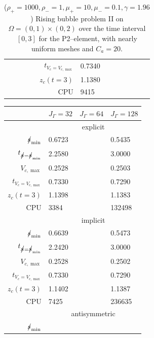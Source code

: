 \begin{table}
\begin{tabular}{rlll}
$t_{V_c = V_{c,\max}}$           & 0.7340 & & \\
$z_c(t=3)$                       & 1.1380 & & \\
CPU                              &   9415 & & \\
\hline
\end{tabular}
\hspace*{-3.25cm}
\caption[Navier--Stokes 2d rising bubble II benchmark values P2--\pdg]
{($\rho_+ = 1000,\rho_- = 1,\mu_+ = 10,\mu_- =0.1,\gamma = 1.96$)
Rising bubble problem II on ${\Omega = (0,1) \times (0,2)}$ over the time
interval $[0,3]$ for the P2--\pdg element, with nearly uniform meshes and
$C_a=20$\textdegree.}
\label{tab:risingbubble2DIIp2p1dg}
\end{table}

\begin{table}
\center
\hspace*{-3.25cm}
\begin{tabular}{rlll}
\hline
 & $J_\Gamma=32$ & $J_\Gamma=64$ & $J_\Gamma=128$ \\
\hline
& \multicolumn{3}{c}{explicit} \\
\cmidrule{2-4}
$\mbox{$s\!\!\!\!\:/$}_{\min}$                & 0.6723 & & 0.5435 \\
$t_{\strikes = \strikes_{\min}}$ & 2.2580 & & 3.0000 \\
$V_{c,\max}$                     & 0.2528 & & 0.2503 \\
$t_{V_c = V_{c,\max}}$           & 0.7330 & & 0.7290 \\
$z_c(t=3)$                       & 1.1398 & & 1.1383 \\
CPU                              &   3384 & & 132498 \\
\cmidrule{2-4}
& \multicolumn{3}{c}{implicit} \\
\cmidrule{2-4}
$\mbox{$s\!\!\!\!\:/$}_{\min}$                & 0.6639 & & 0.5473 \\
$t_{\strikes = \strikes_{\min}}$ & 2.2420 & & 3.0000 \\
$V_{c,\max}$                     & 0.2528 & & 0.2502 \\
$t_{V_c = V_{c,\max}}$           & 0.7330 & & 0.7290 \\
$z_c(t=3)$                       & 1.1402 & & 1.1387 \\
CPU                              &   7425 & & 236635 \\
\cmidrule{2-4}
& \multicolumn{3}{c}{antisymmetric} \\
\cmidrule{2-4}
$\mbox{$s\!\!\!\!\:/$}_{\min}$                & & & \\

\end{tabular}
\end{table}
